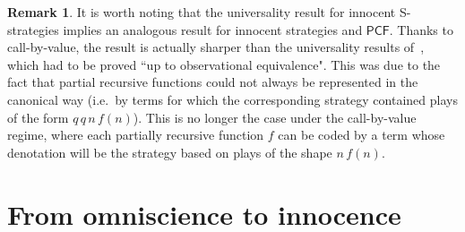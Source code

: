 \documentclass{CSML}
\theoremstyle{definition}\newtheorem{definition}[thm]{Definition}
\theoremstyle{definition}\newtheorem{example}[thm]{Example}
\theoremstyle{definition}\newtheorem{proposition}[thm]{Proposition}
\theoremstyle{definition}\newtheorem{lemma}[thm]{Lemma}
\theoremstyle{definition}\newtheorem{theorem}[thm]{Theorem}
\theoremstyle{definition}\newtheorem{corollary}[thm]{Corollary}
\theoremstyle{definition}\newtheorem{remark}[thm]{Remark}
\newcommand\pcf{\mathsf{PCF}}
\begin{document}
\begin{remark}
It is worth noting that the universality result for innocent S-strategies
implies an analogous result for innocent strategies and $\pcf$.
Thanks to call-by-value, the result is actually sharper than the universality results of~\cite{AJM00,HO00}, which had
to be proved ``up to observational equivalence". This was due to the fact that partial
recursive functions could not always be represented in the canonical way (i.e.\ by
terms for which the corresponding strategy contained plays of the form $q\, q\, n\, f(n)$).
This is no longer the case under the call-by-value
regime, where each partially recursive function $f$ can be coded by a term
whose denotation will be the strategy based on plays of the shape $n\, f(n)$.
\end{remark}



\section{From omniscience to innocence}
\end{document}
